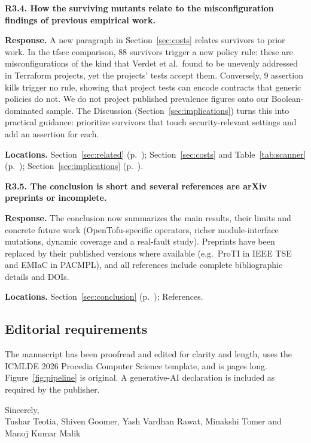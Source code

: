 \medskip
\noindent\textbf{R3.4. How the surviving mutants relate to the misconfiguration findings of previous empirical work.}\par
\textbf{Response.} A new paragraph in Section~\ref{sec:costs} relates survivors to prior work. In the tfsec comparison, 88 survivors trigger a new policy rule: these are misconfigurations of the kind that Verdet et al.\ found to be unevenly addressed in Terraform projects, yet the projects' tests accept them. Conversely, 9 assertion kills trigger no rule, showing that project tests can encode contracts that generic policies do not. We do not project published prevalence figures onto our Boolean-dominated sample. The Discussion (Section~\ref{sec:implications}) turns this into practical guidance: prioritize survivors that touch security-relevant settings and add an assertion for each.\par
\textbf{Locations.} Section~\ref{sec:related} (p.~\pageref{sec:related}); Section~\ref{sec:costs} and Table~\ref{tab:scanner} (p.~\pageref{tab:scanner}); Section~\ref{sec:implications} (p.~\pageref{sec:implications}).

\medskip
\noindent\textbf{R3.5. The conclusion is short and several references are arXiv preprints or incomplete.}\par
\textbf{Response.} The conclusion now summarizes the main results, their limits and concrete future work (OpenTofu-specific operators, richer module-interface mutations, dynamic coverage and a real-fault study). Preprints have been replaced by their published versions where available (e.g.\ ProTI in IEEE TSE and EMIaC in PACMPL), and all references include complete bibliographic details and DOIs.\par
\textbf{Locations.} Section~\ref{sec:conclusion} (p.~\pageref{sec:conclusion}); References.

\subsection*{Editorial requirements}
The manuscript has been proofread and edited for clarity and length, uses the ICMLDE 2026 Procedia Computer Science template, and is \pageref{lastmanuscriptpage} pages long. Figure~\ref{fig:pipeline} is original. A generative-AI declaration is included as required by the publisher.

\medskip
\noindent Sincerely,\\
Tushar Teotia, Shiven Goomer, Yash Vardhan Rawat, Minakshi Tomer and Manoj Kumar Malik
